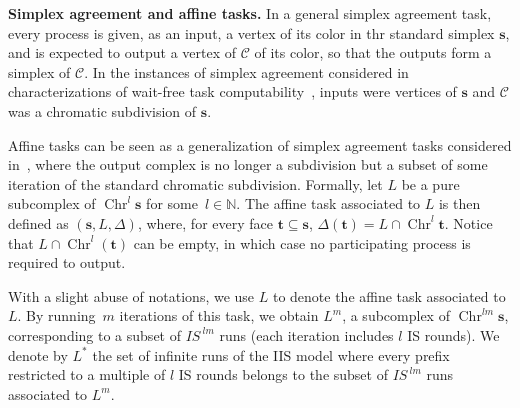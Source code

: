 \documentclass[a4paper]{article}
\newcommand{\myparagraph}[1]{\vspace{6pt}\noindent \textbf{#1}}
\newcommand{\remove}[1]{}
\def\C{\ensuremath{\mathcal{C}}}
\def\s {\mathbf{s}}
\def\t {\mathbf{t}}
\def\Chr{\operatorname{Chr}}
\def\IS{\textit{IS}}
\begin{document}
\remove{
Each 
run of~IS$^m$ corresponds to a simplex in~$\Chr^m \s$. Every 
vertex~$v$ of~$\Chr^m \s$ is thus defined 
as~$(p,\IS^1(p,\sigma),\ldots,\IS^m(p,\sigma))$, where 
each~$\IS^i(p,\sigma)$ is interpreted as the set of processes 
appearing in the~$i^{th}$ IS iteration obtained by~$p$ in the 
corresponding~$\IS^m$ run. The \emph{carrier} of vertex~$v$ is 
then defined as the set of all processes seen by~$p$ in this run, 
possibly through the views of other processes: it is the 
smallest face of~$\s$ that contains~$v$ in its geometric 
realization. The carrier of a simplex is the maximal carrier 
of its vertices (related by inclusion). 
}


\myparagraph{Simplex agreement and affine tasks.}
In a general simplex agreement task, every process is given, as an
input, a vertex of its color in thr standard simplex $\s$, and is
expected to output a vertex of $\C$ of its color, so that the outputs
form a simplex of $\C$.   
In the instances of simplex agreement considered in characterizations
of wait-free task computability~\cite{BG97,HS99}, inputs were vertices
of $\s$ and $\C$ was a chromatic subdivision of $\s$.

Affine tasks can be seen as a generalization of simplex agreement
tasks considered in~\cite{BG97,HS99}, where the output 
complex is no longer a subdivision but a subset of some 
iteration of the standard chromatic subdivision.
Formally, let $L$ be a pure subcomplex of $\Chr^l\s$ for some~$l\in \mathbb{N}$.
The affine task associated to $L$ is then defined as $(\s,L,\Delta)$, 
where, for every face 
$\t \subseteq \s$, $\Delta(\t) = L \cap \Chr^l \t$.
Notice that $L \cap \Chr^l(\t)$ can be empty, in which case no
participating process is required to output.

With a slight abuse of 
notations, we use $L$ to denote the affine task 
associated to $L$. 
By running~$m$ iterations of this task, we obtain $L^m$, a 
subcomplex of $\Chr^{lm}\s$, corresponding to a subset of 
$\IS^{~lm}$ runs (each iteration includes $l$ IS rounds). We 
denote by $L^*$ the set of infinite runs of the IIS model where 
every prefix restricted to a multiple of $l$ IS rounds 
belongs to the subset of $\IS^{~lm}$ runs associated to $L^m$.
\end{document}
